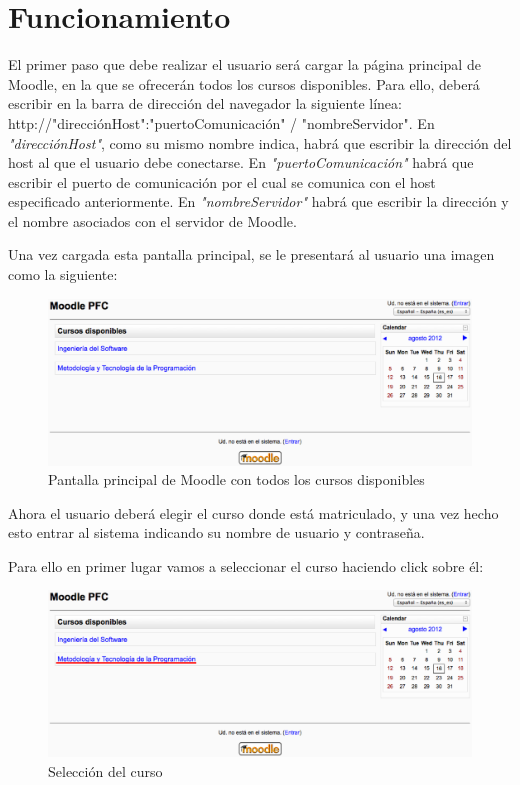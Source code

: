 \chapter[Funcionamiento]{\label{}
Funcionamiento}

El primer paso que debe realizar el usuario será cargar la página principal de Moodle, en la que se ofrecerán todos los cursos disponibles. Para ello, deberá escribir en la barra de dirección del navegador la siguiente línea: http://"direcciónHost":"puertoComunicación" / "nombreServidor". En \emph{"direcciónHost"}, como su mismo nombre indica, habrá que escribir la dirección del host al que el usuario debe conectarse. En \emph{"puertoComunicación"} habrá que escribir el puerto de comunicación por el cual se comunica con el host especificado anteriormente. En \emph{"nombreServidor"} habrá que escribir la dirección y el nombre asociados con el servidor de Moodle.

Una vez cargada esta pantalla principal, se le presentará al usuario una imagen como la siguiente:

\begin{figure}[h]
	\label{pantallaprincipal.eps}
	\includegraphics[width=\textwidth]{./img/pantallaprincipal.eps}
	\caption{Pantalla principal de Moodle con todos los cursos disponibles}
\end{figure}

Ahora el usuario deberá elegir el curso donde está matriculado, y una vez hecho esto entrar al sistema indicando su nombre de usuario y contraseña.

Para ello en primer lugar vamos a seleccionar el curso haciendo click sobre él:

\begin{figure}[h]
	\label{pantallaprincipalselect.eps}
	\includegraphics[width=\textwidth]{./img/pantallaprincipalselect.eps}
	\caption{Selección del curso}
\end{figure}

